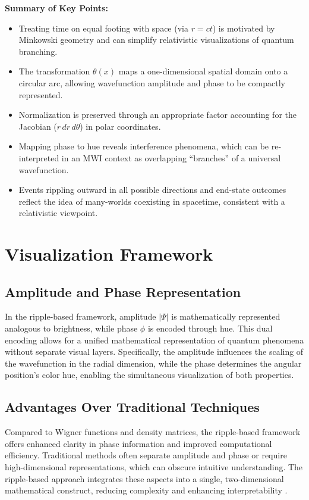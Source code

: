 \documentclass{article}
\begin{document}
\vspace{1em}
\noindent
\textbf{Summary of Key Points:}
\begin{itemize}
    \item Treating time on equal footing with space (via \(r = ct\)) is motivated by Minkowski geometry and can simplify relativistic visualizations of quantum branching.
    \item The transformation \(\theta(x)\) maps a one-dimensional spatial domain onto a circular arc, allowing wavefunction amplitude and phase to be compactly represented.
    \item Normalization is preserved through an appropriate factor accounting for the Jacobian (\(r\,dr\,d\theta\)) in polar coordinates.
    \item Mapping phase to hue reveals interference phenomena, which can be re-interpreted in an MWI context as overlapping “branches” of a universal wavefunction.
    \item Events rippling outward in all possible directions and end-state outcomes reflect the idea of many-worlds coexisting in spacetime, consistent with a relativistic viewpoint.
\end{itemize}

\section{Visualization Framework}
\label{sec:visualization_framework}

\subsection{Amplitude and Phase Representation}

In the ripple-based framework, amplitude \(|\Psi|\) is mathematically represented analogous to brightness, while phase \(\phi\) is encoded through hue. This dual encoding allows for a unified mathematical representation of quantum phenomena without separate visual layers. Specifically, the amplitude influences the scaling of the wavefunction in the radial dimension, while the phase determines the angular position's color hue, enabling the simultaneous visualization of both properties.

\subsection{Advantages Over Traditional Techniques}

Compared to Wigner functions and density matrices, the ripple-based framework offers enhanced clarity in phase information and improved computational efficiency. Traditional methods often separate amplitude and phase or require high-dimensional representations, which can obscure intuitive understanding. The ripple-based approach integrates these aspects into a single, two-dimensional mathematical construct, reducing complexity and enhancing interpretability \citep{wigner1932, vonNeumann1932}.
\end{document}
